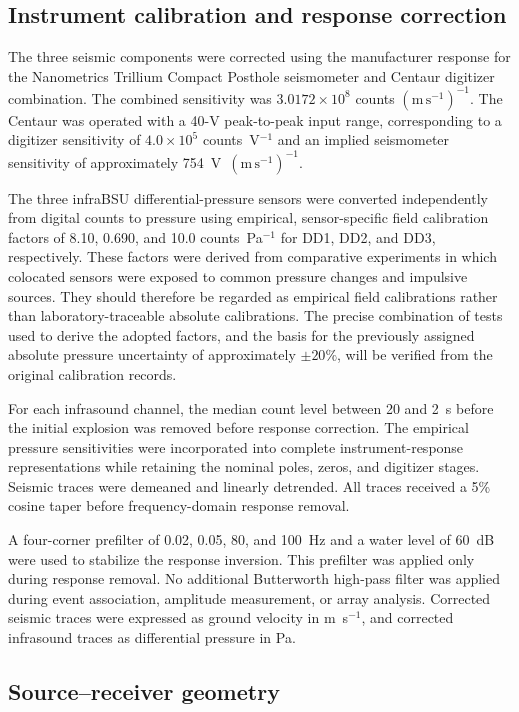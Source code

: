\documentclass[]{seismica}
\begin{document}
\subsection{Instrument calibration and response correction}

The three seismic components were corrected using the manufacturer response
for the Nanometrics Trillium Compact Posthole seismometer and Centaur digitizer
combination. The combined sensitivity was
$3.0172\times10^8$ counts $(\mathrm{m\,s^{-1}})^{-1}$. The Centaur was
operated with a 40-V peak-to-peak input range, corresponding to a digitizer
sensitivity of $4.0\times10^5$ counts~V$^{-1}$ and an implied seismometer
sensitivity of approximately 754~V~$(\mathrm{m\,s^{-1}})^{-1}$.

The three infraBSU differential-pressure sensors were converted independently
from digital counts to pressure using empirical, sensor-specific field
calibration factors of 8.10, 0.690, and 10.0 counts~Pa$^{-1}$ for DD1, DD2,
and DD3, respectively. These factors were derived from comparative experiments
in which colocated sensors were exposed to common pressure changes and
impulsive sources. They should therefore be regarded as empirical field
calibrations rather than laboratory-traceable absolute calibrations. The
precise combination of tests used to derive the adopted factors, and the basis
for the previously assigned absolute pressure uncertainty of approximately
$\pm20\%$, will be verified from the original calibration records.

For each infrasound channel, the median count level between 20 and 2~s before
the initial explosion was removed before response correction. The empirical
pressure sensitivities were incorporated into complete instrument-response
representations while retaining the nominal poles, zeros, and digitizer
stages. Seismic traces were demeaned and linearly detrended. All traces received
a 5\% cosine taper before frequency-domain response removal.

A four-corner prefilter of 0.02, 0.05, 80, and 100~Hz and a water level of
60~dB were used to stabilize the response inversion. This prefilter was applied
only during response removal. No additional Butterworth high-pass filter was
applied during event association, amplitude measurement, or array analysis.
Corrected seismic traces were expressed as ground velocity in
m~s$^{-1}$, and corrected infrasound traces as differential pressure in Pa.


\subsection{Source--receiver geometry}
\end{document}
